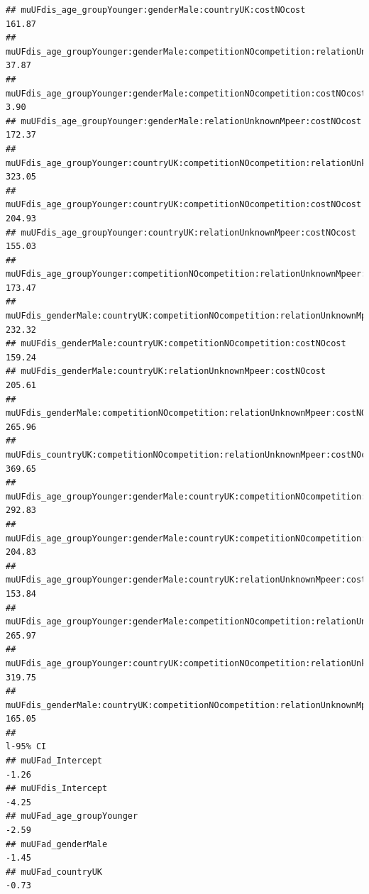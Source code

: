 \documentclass[
]{article}
\begin{document}
\begin{verbatim}
## muUFdis_age_groupYounger:genderMale:countryUK:costNOcost                                        161.87
## muUFdis_age_groupYounger:genderMale:competitionNOcompetition:relationUnknownMpeer                37.87
## muUFdis_age_groupYounger:genderMale:competitionNOcompetition:costNOcost                           3.90
## muUFdis_age_groupYounger:genderMale:relationUnknownMpeer:costNOcost                             172.37
## muUFdis_age_groupYounger:countryUK:competitionNOcompetition:relationUnknownMpeer                323.05
## muUFdis_age_groupYounger:countryUK:competitionNOcompetition:costNOcost                          204.93
## muUFdis_age_groupYounger:countryUK:relationUnknownMpeer:costNOcost                              155.03
## muUFdis_age_groupYounger:competitionNOcompetition:relationUnknownMpeer:costNOcost               173.47
## muUFdis_genderMale:countryUK:competitionNOcompetition:relationUnknownMpeer                      232.32
## muUFdis_genderMale:countryUK:competitionNOcompetition:costNOcost                                159.24
## muUFdis_genderMale:countryUK:relationUnknownMpeer:costNOcost                                    205.61
## muUFdis_genderMale:competitionNOcompetition:relationUnknownMpeer:costNOcost                     265.96
## muUFdis_countryUK:competitionNOcompetition:relationUnknownMpeer:costNOcost                      369.65
## muUFdis_age_groupYounger:genderMale:countryUK:competitionNOcompetition:relationUnknownMpeer     292.83
## muUFdis_age_groupYounger:genderMale:countryUK:competitionNOcompetition:costNOcost               204.83
## muUFdis_age_groupYounger:genderMale:countryUK:relationUnknownMpeer:costNOcost                   153.84
## muUFdis_age_groupYounger:genderMale:competitionNOcompetition:relationUnknownMpeer:costNOcost    265.97
## muUFdis_age_groupYounger:countryUK:competitionNOcompetition:relationUnknownMpeer:costNOcost     319.75
## muUFdis_genderMale:countryUK:competitionNOcompetition:relationUnknownMpeer:costNOcost           165.05
##                                                                                              l-95% CI
## muUFad_Intercept                                                                                -1.26
## muUFdis_Intercept                                                                               -4.25
## muUFad_age_groupYounger                                                                         -2.59
## muUFad_genderMale                                                                               -1.45
## muUFad_countryUK                                                                                -0.73

\end{verbatim}
\end{document}
